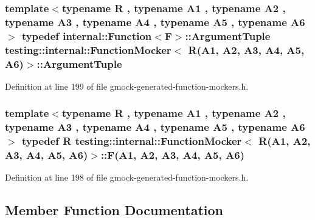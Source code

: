 \subsubsection[{\texorpdfstring{Argument\+Tuple}{ArgumentTuple}}]{\setlength{\rightskip}{0pt plus 5cm}template$<$typename R , typename A1 , typename A2 , typename A3 , typename A4 , typename A5 , typename A6 $>$ typedef {\bf internal\+::\+Function}$<${\bf F}$>$\+::{\bf Argument\+Tuple} {\bf testing\+::internal\+::\+Function\+Mocker}$<$ {\bf R}(A1, A2, A3, A4, A5, A6)$>$\+::{\bf Argument\+Tuple}}\hypertarget{classtesting_1_1internal_1_1_function_mocker_3_01_r_07_a1_00_01_a2_00_01_a3_00_01_a4_00_01_a5_00_01_a6_08_4_a0c8bc671adc8e67e8a49a01432407139}{}\label{classtesting_1_1internal_1_1_function_mocker_3_01_r_07_a1_00_01_a2_00_01_a3_00_01_a4_00_01_a5_00_01_a6_08_4_a0c8bc671adc8e67e8a49a01432407139}


Definition at line 199 of file gmock-\/generated-\/function-\/mockers.\+h.

\subsubsection[{\texorpdfstring{F}{F}}]{\setlength{\rightskip}{0pt plus 5cm}template$<$typename R , typename A1 , typename A2 , typename A3 , typename A4 , typename A5 , typename A6 $>$ typedef {\bf R} {\bf testing\+::internal\+::\+Function\+Mocker}$<$ {\bf R}(A1, A2, A3, A4, A5, A6)$>$\+::F(A1, A2, A3, A4, A5, A6)}\hypertarget{classtesting_1_1internal_1_1_function_mocker_3_01_r_07_a1_00_01_a2_00_01_a3_00_01_a4_00_01_a5_00_01_a6_08_4_a5373cd66051f0a54e83b0497004df058}{}\label{classtesting_1_1internal_1_1_function_mocker_3_01_r_07_a1_00_01_a2_00_01_a3_00_01_a4_00_01_a5_00_01_a6_08_4_a5373cd66051f0a54e83b0497004df058}


Definition at line 198 of file gmock-\/generated-\/function-\/mockers.\+h.



\subsection{Member Function Documentation}
